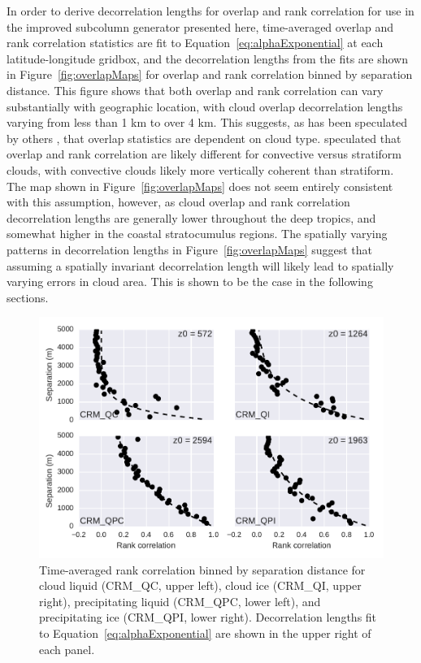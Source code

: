 In order to derive decorrelation lengths for overlap and rank
correlation for use in the improved subcolumn generator presented here,
time-averaged overlap and rank correlation statistics are fit to
Equation~\ref{eq:alphaExponential} at each latitude-longitude gridbox,
and the decorrelation lengths from the fits are shown in
Figure~\ref{fig:overlapMaps} for overlap and rank correlation binned by
separation distance. This figure shows that both overlap and rank
correlation can vary substantially with geographic location, with cloud
overlap decorrelation lengths varying from less than 1 km to over 4 km.
This suggests, as has been speculated by others
\citep[e.g.,][]{pincus_et_al_2005}, that overlap statistics are
dependent on cloud type. \citet{pincus_et_al_2005} speculated that
overlap and rank correlation are likely different for convective versus
stratiform clouds, with convective clouds likely more vertically
coherent than stratiform. The map shown in Figure~\ref{fig:overlapMaps}
does not seem entirely consistent with this assumption, however, as
cloud overlap and rank correlation decorrelation lengths are generally
lower throughout the deep tropics, and somewhat higher in the coastal
stratocumulus regions. The spatially varying patterns in decorrelation
lengths in Figure~\ref{fig:overlapMaps} suggest that assuming a
spatially invariant decorrelation length will likely lead to spatially
varying errors in cloud area. This is shown to be the case in the
following sections.

\begin{figure}[htbp]
\centering
\includegraphics{graphics/subgrid2_rankcorr_dz.pdf}
\caption{\label{fig:rankcorrScatter}Time-averaged rank correlation
binned by separation distance for cloud liquid (CRM\_QC, upper left),
cloud ice (CRM\_QI, upper right), precipitating liquid (CRM\_QPC, lower
left), and precipitating ice (CRM\_QPI, lower right). Decorrelation
lengths fit to Equation~\ref{eq:alphaExponential} are shown in the upper
right of each panel.}\label{fig:rankcorrScatter}
\end{figure}

